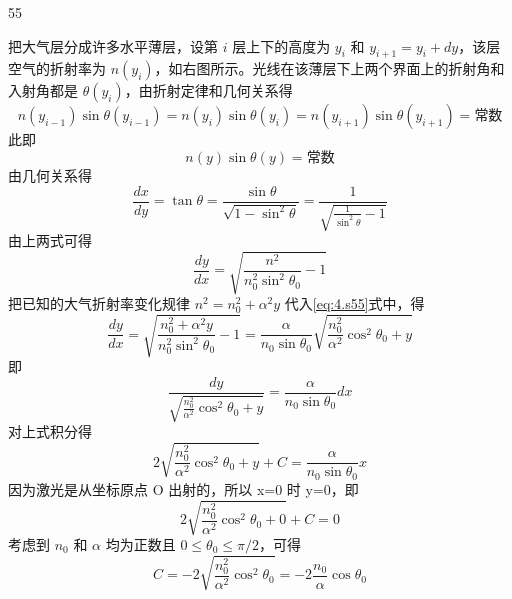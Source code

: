 \begin{solution}{55}
\begin{subsolution}
把大气层分成许多水平薄层，设第 $i$ 层上下的高度为 $y_{i}$ 和 $y_{i+1} = y_i + dy$，该层空气的折射率为 $n(y_{i})$，如右图所示。光线在该薄层下上两个界面上的折射角和入射角都是 $\theta(y_i)$，由折射定律和几何关系得
\begin{equation}
n(y_{i-1})\sin\theta(y_{i-1}) = n(y_{i})\sin\theta(y_{i}) = n(y_{i+1})\sin\theta(y_{i+1}) = \text{常数}
\label{eq:1.s55}
\end{equation}
此即
\begin{equation}
n(y)\sin\theta(y) = \text{常数}
\label{eq:2.s55}
\end{equation}
由几何关系得
\begin{equation}
\frac{dx}{dy} = \tan\theta = \frac{\sin\theta}{\sqrt{1-\sin^{2}\theta}} = \frac{1}{\sqrt{\frac{1}{\sin^{2}\theta}-1}}
\label{eq:3.s55}
\end{equation}
由上两式可得
\begin{equation}
\frac{dy}{dx} = \sqrt{\frac{n^{2}}{n_{0}^{2}\sin^{2}\theta_{0}}-1}
\label{eq:4.s55}
\end{equation}
把已知的大气折射率变化规律 $n^{2}=n_{0}^{2}+\alpha^{2}y$ 代入\eqref{eq:4.s55}式中，得
\begin{equation}
\frac{dy}{dx} = \sqrt{\frac{n_{0}^{2}+\alpha^{2}y}{n_{0}^{2}\sin^{2}\theta_{0}}-1} = \frac{\alpha}{n_{0}\sin\theta_{0}}\sqrt{\frac{n_{0}^{2}}{\alpha^{2}}\cos^{2}\theta_{0}+y}
\label{eq:5.s55}
\end{equation}
即
\begin{equation}
\frac{dy}{\sqrt{\frac{n_{0}^{2}}{\alpha^{2}}\cos^{2}\theta_{0}+y}} = \frac{\alpha}{n_{0}\sin\theta_{0}}dx
\label{eq:6.s55}
\end{equation}
对上式积分得
\begin{equation}
2\sqrt{\frac{n_{0}^{2}}{\alpha^{2}}\cos^{2}\theta_{0}+y} + C = \frac{\alpha}{n_{0}\sin\theta_{0}}x
\label{eq:7.s55}
\end{equation}
因为激光是从坐标原点 O 出射的，所以 x=0 时 y=0，即
\begin{equation}
2\sqrt{\frac{n_{0}^{2}}{\alpha^{2}}\cos^{2}\theta_{0}+0} + C = 0
\label{eq:8.s55}
\end{equation}
考虑到 $n_0$ 和 $\alpha$ 均为正数且 $0 \leq \theta_0 \leq \pi/2$，可得
\begin{equation}
C = -2\sqrt{\frac{n_{0}^{2}}{\alpha^{2}}\cos^{2}\theta_{0}} = -2\frac{n_{0}}{\alpha}\cos\theta_{0}
\label{eq:9.s55}
\end{equation}

\end{subsolution}
\end{solution}
